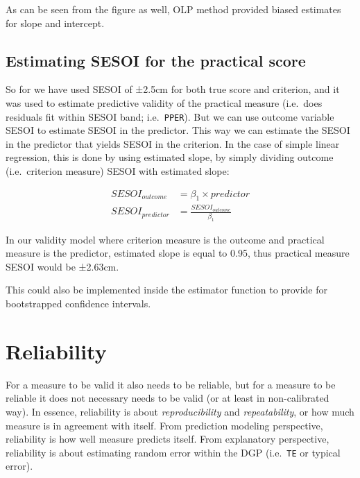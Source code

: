 \documentclass[
]{book}
\begin{document}
As can be seen from the figure as well, OLP method provided biased estimates for slope and intercept.

\hypertarget{estimating-sesoi-for-the-practical-score}{%
\subsection{Estimating SESOI for the practical score}\label{estimating-sesoi-for-the-practical-score}}

So for we have used SESOI of ±2.5cm for both true score and criterion, and it was used to estimate predictive validity of the practical measure (i.e.~does residuals fit within SESOI band; i.e.~\texttt{PPER}). But we can use outcome variable SESOI to estimate SESOI in the predictor. This way we can estimate the SESOI in the predictor that yields SESOI in the criterion. In the case of simple linear regression, this is done by using estimated slope, by simply dividing outcome (i.e.~criterion measure) SESOI with estimated slope:

\begin{equation}
  \begin{split}
  SESOI_{outcome} &= \beta_1 \times predictor \\
  SESOI_{predictor} &= \frac{SESOI_{outcome}}{\beta_1}
  \end{split}
\end{equation}

In our validity model where criterion measure is the outcome and practical measure is the predictor, estimated slope is equal to 0.95, thus practical measure SESOI would be ±2.63cm.

This could also be implemented inside the estimator function to provide for bootstrapped confidence intervals.

\hypertarget{reliability}{%
\section{Reliability}\label{reliability}}

For a measure to be valid it also needs to be reliable, but for a measure to be reliable it does not necessary needs to be valid (or at least in non-calibrated way). In essence, reliability is about \emph{reproducibility} and \emph{repeatability}, or how much measure is in agreement with itself. From prediction modeling perspective, reliability is how well measure predicts itself. From explanatory perspective, reliability is about estimating random error within the DGP (i.e.~\texttt{TE} or typical error).
\end{document}
